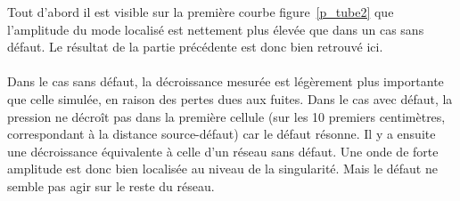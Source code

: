 Tout d'abord il est visible sur la première courbe figure~\ref{p_tube2} que l'amplitude du mode localisé est nettement plus élevée que dans un cas sans défaut. Le résultat de la partie précédente est donc bien retrouvé ici. \\~\\

Dans le cas sans défaut, la décroissance mesurée est légèrement plus importante que celle simulée, en raison des pertes dues aux fuites.
Dans le cas avec défaut, la pression ne décroît pas dans la première cellule (sur les 10 premiers centimètres, correspondant à la distance source-défaut) car le défaut résonne. Il y a ensuite une décroissance équivalente à celle d'un réseau sans défaut.
Une onde de forte amplitude est donc bien localisée au niveau de la singularité. Mais le défaut ne semble pas agir sur le reste du réseau. \\~\\





